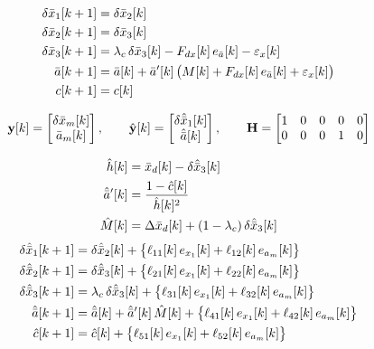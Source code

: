 \[
\begin{aligned}
\delta\bar{x}_1[k+1] &= \delta\bar{x}_2[k] \\
\delta\bar{x}_2[k+1] &= \delta\bar{x}_3[k] \\
\delta\bar{x}_3[k+1] &= \lambda_c\,\delta\bar{x}_3[k] - F_{dx}[k]\,e_{\bar{a}}[k] - \varepsilon_x[k] \\
\bar{a}[k+1] &= \bar{a}[k] + \bar{a}'[k]\,\big(M[k] + F_{dx}[k]\,e_{\bar{a}}[k] + \varepsilon_x[k]\big) \\
c[k+1] &= c[k]
\end{aligned}
\]

\[
\mathbf{y}[k] = \begin{bmatrix} \delta\bar{x}_m[k] \\ \bar{a}_m[k] \end{bmatrix},
\qquad
\hat{\mathbf{y}}[k] = \begin{bmatrix} \delta\hat{\bar{x}}_1[k] \\ \hat{\bar{a}}[k] \end{bmatrix},
\qquad
\mathbf{H} =
\begin{bmatrix}
1 & 0 & 0 & 0 & 0 \\
0 & 0 & 0 & 1 & 0
\end{bmatrix}
\]

\[
\begin{aligned}
\hat{h}[k] &= \bar{x}_d[k] - \delta\hat{\bar{x}}_3[k] \\
\hat{\bar{a}}'[k] &= \frac{1 - \hat{c}[k]}{\hat{h}[k]^{2}} \\
\hat{M}[k] &= \Delta\bar{x}_d[k] + (1-\lambda_c)\,\delta\hat{\bar{x}}_3[k]
\end{aligned}
\]
\[
\begin{aligned}
\delta\hat{\bar{x}}_1[k+1] &= \delta\hat{\bar{x}}_2[k] + \big\{\ell_{11}[k]\,e_{x_1}[k] + \ell_{12}[k]\,e_{a_m}[k]\big\} \\
\delta\hat{\bar{x}}_2[k+1] &= \delta\hat{\bar{x}}_3[k] + \big\{\ell_{21}[k]\,e_{x_1}[k] + \ell_{22}[k]\,e_{a_m}[k]\big\} \\
\delta\hat{\bar{x}}_3[k+1] &= \lambda_c\,\delta\hat{\bar{x}}_3[k] + \big\{\ell_{31}[k]\,e_{x_1}[k] + \ell_{32}[k]\,e_{a_m}[k]\big\} \\
\hat{\bar{a}}[k+1] &= \hat{\bar{a}}[k] + \hat{\bar{a}}'[k]\,\hat{M}[k] + \big\{\ell_{41}[k]\,e_{x_1}[k] + \ell_{42}[k]\,e_{a_m}[k]\big\} \\
\hat{c}[k+1] &= \hat{c}[k] + \big\{\ell_{51}[k]\,e_{x_1}[k] + \ell_{52}[k]\,e_{a_m}[k]\big\}
\end{aligned}
\]

